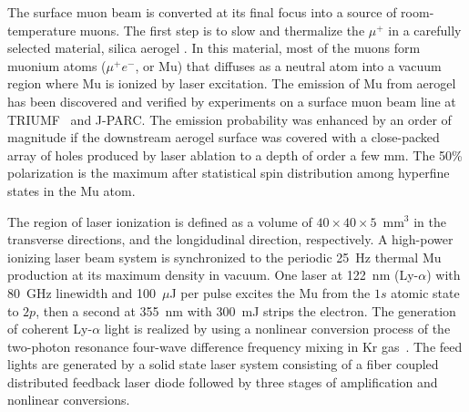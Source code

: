 The surface muon beam is converted at its final focus into a
source of room-temperature muons. The first step is to
slow and thermalize the $\mu^{+}$ in a carefully selected
material, silica aerogel \cite{Tabata:2011aa}.  In this
material, most of the muons form muonium atoms ($\mu^{+}e^{-}$, or Mu)
that diffuses as a neutral atom into a vacuum region where Mu is
ionized by laser excitation.
The emission of Mu from aerogel has been discovered and verified by experiments
on a surface muon beam line at TRIUMF~\cite{Bakule:2013poa,Beer:2014ooa} and J-PARC.
The emission probability was enhanced by an order of magnitude if the
downstream aerogel surface was covered with a close-packed array of holes
produced by laser ablation to a depth of order a few mm. 
The 50\% polarization is the maximum after statistical spin
distribution among hyperfine states in the Mu atom.

The region of laser ionization is defined as a volume of $40\times 40\times 5$~mm$^3$ in the transverse directions,
and the longidudinal direction, respectively.
A high-power ionizing laser beam system is synchronized to the
periodic 25~Hz thermal Mu production at its maximum density in vacuum.
One laser at 122~nm (Ly-$\alpha$) with 80~GHz linewidth and 100~$\mu$J per pulse excites the Mu from the $1s$ atomic state
to $2p$, then a second at 355~nm with 300~mJ strips the electron. 
The generation of coherent Ly-$\alpha$ light is realized by using a nonlinear conversion process 
of the two-photon resonance four-wave difference frequency mixing in Kr gas~\cite{laser:2016}.
The feed lights are generated by a solid state laser system consisting of 
a fiber coupled distributed feedback laser diode followed by
three stages of amplification and nonlinear conversions.



